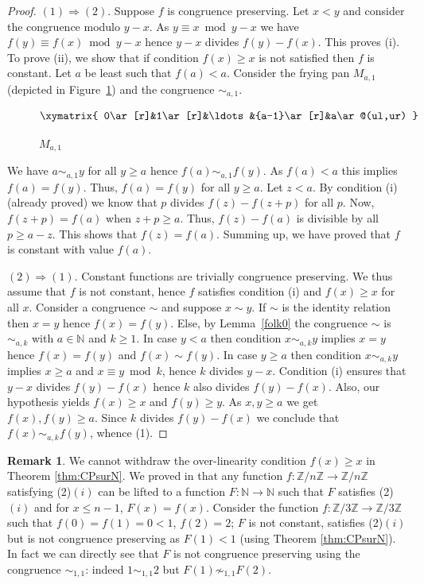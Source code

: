 \documentclass[11pt,a4paper]{article}
\theoremstyle{definition} %
\newtheorem{remark}[theorem]{Remark}
\newcommand\+[1]{\mathcal{#1}} %
\newcommand{\N}{{\mathbb N}}     %
\newcommand{\Z}{{\mathbb Z}}     %
\begin{document}
\begin{proof}
$(1)\Rightarrow(2)$.
Suppose $f$ is congruence preserving. 
Let $x<y$ and consider the congruence modulo $y-x$.
As $y\equiv x\bmod y-x$ we have $f(y)\equiv f(x)\bmod y-x$ hence $y-x$ divides $f(y)-f(x)$.
This proves (i).
To prove (ii), we show that if condition $f(x)\geq x$ is not satisfied then $f$ is constant.
Let $a$ be least such that $f(a)<a$.
 Consider 
the frying pan $M_{a,1}$ (depicted in Figure~\ref{Ma,1}) 
and the congruence $\sim_{a,1}$. 
\begin{figure}[h]
\[\xymatrix{
0\ar[r]&1\ar[r]&\ldots &{a-1}\ar[r]&a\ar@(ul,ur)
}\]
\caption{$M_{a,1}$}\label{Ma,1}
\end{figure}
We have $a\sim_{a,1} y$ for all $y\geq a$ hence $f(a)\sim_{a,1}f(y)$. 
As $f(a)<a$ this implies $f(a)=f(y)$.
Thus, $f(a)=f(y)$ for all $y\geq a$.
Let $z<a$. By condition (i) (already proved) we know that $p$ divides $f(z)-f(z+p)$ for all $p$.
Now, $f(z+p)=f(a)$ when $z+p\geq a$. Thus, $f(z)-f(a)$ is divisible by all $p\geq a-z$.
This shows that $f(z)=f(a)$.
Summing up, we have proved that $f$ is constant with value $f(a)$.

$(2)\Rightarrow(1)$.
Constant functions are trivially congruence preserving. 
We thus assume that $f$ is not constant, hence $f$ satisfies condition (i) and $f(x)\geq x$ for all $x$.
Consider a congruence $\sim$ and suppose $x\sim y$. 
If $\sim$ is the identity relation then $x=y$ hence $f(x)=f(y)$.
Else, by Lemma~\ref{folk0} the congruence $\sim$ is $\sim_{a,k}$ with $a\in\N$ and $k\geq1$.
In case $y<a$ then condition $x\sim_{a,k} y$ implies $x=y$ hence $f(x)=f(y)$ and $f(x)\sim f(y)$.
In case $y\geq a$ then condition $x\sim_{a,k} y$ implies $x\geq a$ and $x\equiv y\bmod k$,
hence $k$ divides $y-x$.
Condition (i) ensures that $y-x$ divides $f(y)-f(x)$ hence $k$ also divides $f(y)-f(x)$.
Also, our hypothesis yields $f(x)\geq x$ and $f(y)\geq y$.
As $x,y\geq a$ we get $f(x),f(y)\geq a$. Since $k$ divides $f(y)-f(x)$ we conclude that 
$f(x)\sim_{a,k} f(y)$, whence (1).
\end{proof}
%
\begin{remark}\label{exCPnonsurlineaire} 
 We cannot withdraw the over-linearity condition $f(x)\geq x$ in Theorem \ref{thm:CPsurN}. We proved in {\rm\cite{cgg15}} that any function $f\colon\Z/n\Z\to
\Z/n\Z$ satisfying (2)$(i)$ can be lifted to a function $F\colon\N\to\N$  such that $F$ satisfies (2)$(i)$ and for $x\leq n-1$, $F(x)=f(x)$. Consider the function $f\colon\Z/3\Z\to\Z/3\Z$  such that $f(0) = f(1)=0<1$, $f(2)=2$;  $F$ is not constant, satisfies (2)$(i)$ but is not congruence preserving as $F(1)<1$  (using Theorem \ref{thm:CPsurN}). In fact we can  directly see that 
$F$ is not congruence preserving using the congruence $\sim_{1,1}$: indeed $1\sim_{1,1}2$
but $F(1)\not\sim_{1,1}F(2)$.
\end{remark}
\end{document}
